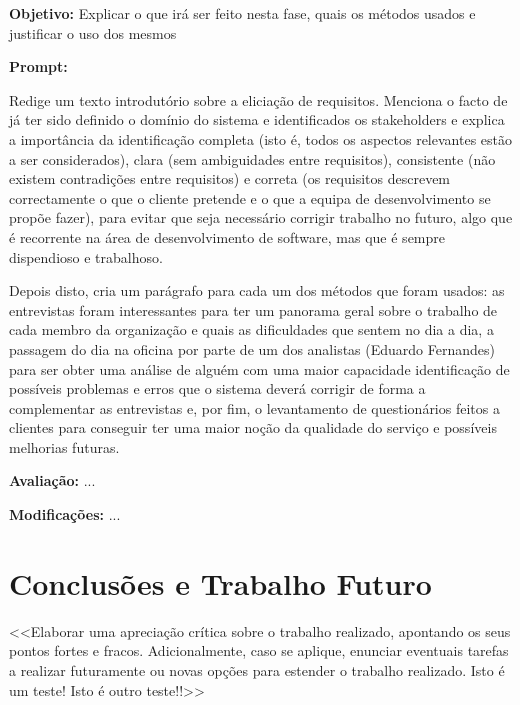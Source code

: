 \documentclass[a4paper,12pt]{scrreprt}
\begin{document}
\begin{tcolorbox}[
	title={Prompt P14 - Escrita do texto introdutório da eliciação de requisitos},
	colback=white,
	colframe=black,
	arc=2mm,
	boxrule=0.5pt
	]
	\textbf{Objetivo:} Explicar o que irá ser feito nesta fase, quais os métodos usados e justificar o uso dos mesmos \par
	\textbf{Prompt:} 
	\begin{tcolorbox}[
		listing only,
		breakable,
		enhanced,
		colback=white,
		colframe=black,
		listing options={
			breaklines=true,
			basicstyle=\ttfamily\small
		}
		]
		Redige um texto introdutório sobre a eliciação de requisitos. Menciona o facto de já ter sido definido o domínio do sistema e identificados os stakeholders e explica a importância da identificação completa (isto é, todos os aspectos relevantes estão a ser considerados), clara (sem ambiguidades entre requisitos), consistente (não existem contradições entre requisitos) e correta (os requisitos descrevem correctamente o que o cliente pretende e o que a equipa de desenvolvimento se propõe fazer), para evitar que seja necessário corrigir trabalho no futuro, algo que é recorrente na área de desenvolvimento de software, mas que é sempre dispendioso e trabalhoso.
    
    Depois disto, cria um parágrafo para cada um dos métodos que foram usados: as entrevistas foram interessantes para ter um panorama geral sobre o trabalho de cada membro da organização e quais as dificuldades que sentem no dia a dia, a passagem do dia na oficina por parte de um dos analistas (Eduardo Fernandes) para ser obter uma análise de alguém com uma maior capacidade identificação de possíveis problemas e erros que o sistema deverá corrigir de forma a complementar as entrevistas e, por fim, o levantamento de questionários feitos a clientes para conseguir ter uma maior noção da qualidade do serviço e possíveis melhorias futuras.
	\end{tcolorbox}
	\par
	\textbf{Avaliação:} ... \par
	\textbf{Modificações:} ... \par
\end{tcolorbox}



\chapter{Conclusões e Trabalho Futuro}
    <<Elaborar uma apreciação crítica sobre o trabalho realizado, apontando os seus pontos fortes e fracos. Adicionalmente, caso se aplique, enunciar eventuais tarefas a realizar futuramente ou novas opções para estender o trabalho realizado. Isto é um teste! Isto é outro teste!!>>
\end{document}
